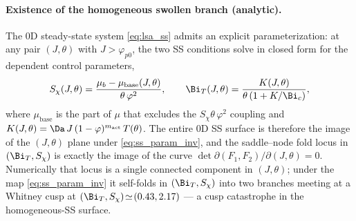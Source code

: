 \paragraph{Existence of the homogeneous swollen branch (analytic).}
The 0D steady-state system \eqref{eq:lsa_ss} admits an explicit
parameterization: at any pair $(J,\theta)$ with $J>\varphi_{p0}$,
the two SS conditions solve in closed form for the dependent
control parameters,
\begin{equation}
  S_\chi(J,\theta) =
    \frac{\mu_b - \mu_{\mathrm{base}}(J,\theta)}{\theta\,\varphi^2}, \qquad
  \Bi_T(J,\theta) = \frac{K(J,\theta)}{\theta\,(1+K/\Bi_c)},
  \label{eq:ss_param_inv}
\end{equation}
where $\mu_{\mathrm{base}}$ is the part of $\mu$ that excludes the
$S_\chi\theta\,\varphi^2$ coupling and
$K(J,\theta)=\Da\,J\,(1-\varphi)^{m_\mathrm{act}}\,T(\theta)$.  The
entire 0D SS surface is therefore the image of the $(J,\theta)$ plane
under \eqref{eq:ss_param_inv}, and the saddle--node fold locus in
$(\Bi_T, S_\chi)$ is exactly the image of the curve
$\det\partial(F_1,F_2)/\partial(J,\theta)=0$.  Numerically that locus
is a single connected component in $(J,\theta)$; under the map
\eqref{eq:ss_param_inv} it self-folds in $(\Bi_T,S_\chi)$ into two
branches meeting at a Whitney cusp at
$(\Bi_T,S_\chi)\!\simeq\!(0.43, 2.17)$ — a cusp catastrophe in the
homogeneous-SS surface.

